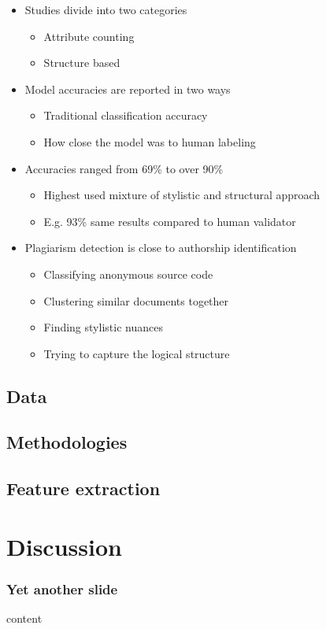 \documentclass[t,12pt,pdftex]{beamer}
\begin{document}
\begin{frame}
	\vspace{0.5in}
	\begin{itemize}
		\item Studies divide into two categories
		\begin{itemize}
			\item Attribute counting
			\item Structure based
		\end{itemize}
		\item Model accuracies are reported in two ways
		\begin{itemize}
			\item Traditional classification accuracy
			\item How close the model was to human labeling
		\end{itemize}
		\item Accuracies ranged from 69\% to over 90\%
		\begin{itemize}
			\item Highest used mixture of stylistic and structural approach
			\item E.g. 93\% same results compared to human validator
		\end{itemize}
	\end{itemize}
\end{frame}

\begin{frame}
	\vspace{0.5in}
	\begin{itemize}
		\item Plagiarism detection is close to authorship identification
			\begin{itemize}
			\item Classifying anonymous source code
			\item Clustering similar documents together
			\item Finding stylistic nuances
			\item Trying to capture the logical structure
		\end{itemize}
	\end{itemize}
\end{frame}

\subsection{Data}
\subsection{Methodologies}
\subsection{Feature extraction}

\section{Discussion}

\begin{frame}
	\frametitle{Yet another slide}
	
	content
\end{frame}
\end{document}
